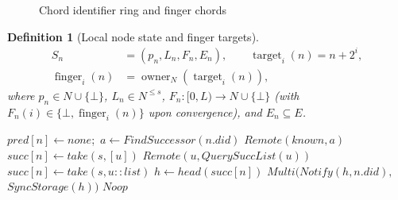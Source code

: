 \documentclass[journal]{IEEEtran}
\newtheorem{definition}{Definition}
\begin{document}
\begin{figure}[h]
    \begin{center}
    \end{center}
      \caption{Chord identifier ring and finger chords}
    \label{dht}
\end{figure}

\begin{definition}[Local node state and finger targets]
\[
\begin{aligned}
  S_n &= (p_n,L_n,F_n,E_n),\qquad
  \operatorname{target}_i(n) = n+2^i,\\
  \operatorname{finger}_i(n) &= \operatorname{owner}_N(\operatorname{target}_i(n)),
\end{aligned}
\]
where $p_n\in N\cup\{\bot\}$, $L_n\in N^{\leq s}$, $F_n:[0,L)\to N\cup\{\bot\}$ (with $F_n(i)\in\{\bot,\operatorname{finger}_i(n)\}$ upon convergence), and $E_n\subseteq E$.
\end{definition}

\begin{algorithm}[htbp]
\caption{DHT Join Transitions}
\label{alg:join}
\begin{algorithmic}[1]
\State $pred[n]\gets none$;\ $a\gets \mathit{FindSuccessor}(n.did)$
\State \Return $Remote(known, a)$
\EndFunction
{}
\State $succ[n]\gets take(s, [u])$
\State \Return $Remote(u, QuerySuccList(u))$
\EndFunction
{}
\State $succ[n]\gets take(s, u :: list)$
\State $h\gets head(succ[n])$
\State \Return $Multi(Notify(h, n.did),$ $\allowbreak SyncStorage(h))$
\Else
\State \Return $Noop$
\EndIf
\EndFunction
\end{algorithmic}
\end{algorithm}
\end{document}
